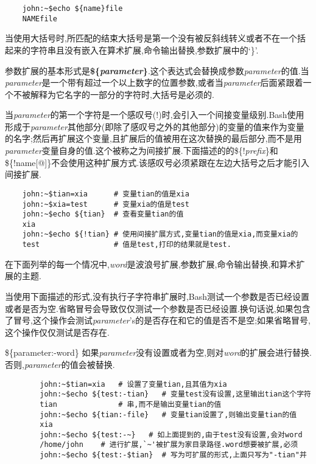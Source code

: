 \documentclass[draft,openany]{book}
\begin{document}
\begin{CJK}{UTF8}{gbsn}
\begin{verbatim}
    john:~$echo ${name}file
    NAMEfile
    \end{verbatim}
    当使用大括号时,所匹配的结束大括号是第一个没有被反斜线转义或者不在一个括起来的字符串且没有嵌入在算术扩展,命令输出替换,参数扩展中的`\}'.\par
    参数扩展的基本形式是\textbf{\$\{\emph{parameter}\}}.这个表达式会替换成参数\emph{parameter}的值.当\emph{parameter}是一个带有超过一个以上数字的位置参数,或者当\emph{parameter}后面紧跟着一个不被解释为它名字的一部分的字符时,大括号是必须的.\par
    当\emph{parameter}的第一个字符是一个感叹号(!)时,会引入一个间接变量级别.Bash使用形成于\emph{parameter}其他部分(即除了感叹号之外的其他部分)的变量的值来作为变量的名字;然后再扩展这个变量,且扩展后的值被用在这次替换的最后部分,而不是用\emph{parameter}变量自身的值.这个被称之为间接扩展.下面描述的的\$\{!\emph{prefix}\}和\$\{!name[@]\}不会使用这种扩展方式.该感叹号必须紧跟在左边大括号之后才能引入间接扩展.\par
    \begin{verbatim}
    john:~$tian=xia      # 变量tian的值是xia
    john:~$xia=test      # 变量xia的值是test
    john:~$echo ${tian}  # 查看变量tian的值
    xia
    john:~$echo ${!tian} # 使用间接扩展方式,变量tian的值是xia,而变量xia的
    test                 # 值是test,打印的结果就是test.
    \end{verbatim}
    在下面列举的每一个情况中,\emph{word}是波浪号扩展,参数扩展,命令输出替换,和算术扩展的主题.\par
    当使用下面描述的形式,没有执行子字符串扩展时,Bash测试一个参数是否已经设置或者是否为空.省略冒号会导致仅仅测试一个参数是否已经设置.换句话说,如果包含了冒号,这个操作会测试\emph{parameter}'s的是否存在和它的值是否不是空;如果省略冒号,这个操作仅仅测试是否存在.
    \begin{basedescript}{\desclabelstyle{\nextlinelabel}\desclabelwidth{2.5em}}
    \item[\$\{parameter:-word\}] 如果\emph{parameter}没有设置或者为空,则对\emph{word}的扩展会进行替换.否则,\emph{parameter}的值会被替换.
        \begin{verbatim}
        john:~$tian=xia   # 设置了变量tian,且其值为xia
        john:~$echo ${test:-tian}   # 变量test没有设置,这里输出tian这个字符
        tian              # 串,而不是输出变量tian的值
        john:~$echo ${tian:-file}   # 变量tian设置了,则输出变量tian的值
        xia
        john:~$echo ${test:-~}   # 如上面提到的,由于test没有设置,会对word
        /home/john    # 进行扩展,`~'被扩展为家目录路径.word想要被扩展,必须
        john:~$echo ${test:-$tian}  # 写为可扩展的形式,上面只写为"-tian"并

\end{verbatim}
\end{basedescript}
\end{CJK}
\end{document}
